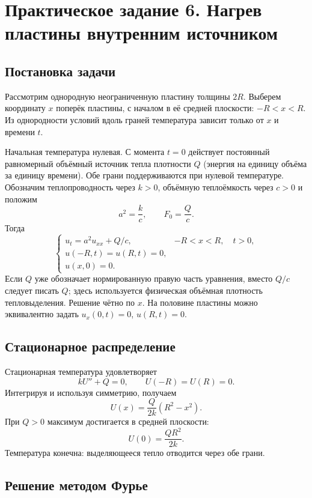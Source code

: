 \chapter{Практическое задание 6. Нагрев пластины внутренним источником}

\section{Постановка задачи}

Рассмотрим однородную неограниченную пластину толщины $2R$.
Выберем координату $x$ поперёк пластины, с началом в её средней плоскости:
$-R<x<R$. Из однородности условий вдоль граней температура зависит
только от $x$ и времени $t$.

Начальная температура нулевая. С момента $t=0$ действует постоянный
равномерный объёмный источник тепла плотности $Q$ (энергия на единицу
объёма за единицу времени). Обе грани поддерживаются при нулевой
температуре. Обозначим теплопроводность через $k>0$, объёмную
теплоёмкость через $c>0$ и положим
\[
 a^2=\frac{k}{c},\qquad F_0=\frac Qc.
\]
Тогда
\[
\boxed{\begin{cases}
 u_t=a^2u_{xx}+Q/c,&-R<x<R,\quad t>0,\\
 u(-R,t)=u(R,t)=0,\\
 u(x,0)=0.
\end{cases}}
\]
Если $Q$ уже обозначает нормированную правую часть уравнения,
вместо $Q/c$ следует писать $Q$; здесь используется физическая
объёмная плотность тепловыделения.
Решение чётно по $x$. На половине пластины можно эквивалентно
задать $u_x(0,t)=0$, $u(R,t)=0$.

\section{Стационарное распределение}

Стационарная температура удовлетворяет
\[
 kU''+Q=0,\qquad U(-R)=U(R)=0.
\]
Интегрируя и используя симметрию, получаем
\[
\boxed{U(x)=\frac Q{2k}(R^2-x^2).}
\]
При $Q>0$ максимум достигается в средней плоскости:
\[
 U(0)=\frac{QR^2}{2k}.
\]
Температура конечна: выделяющееся тепло отводится через обе грани.

\section{Решение методом Фурье}

